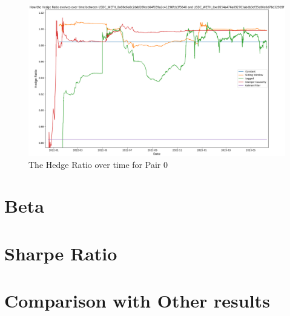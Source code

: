 \begin{figure}[H]
    \centering
    \includegraphics[width=\linewidth]{evaluation/Images/HedgeRatioPerStrat.png}
    \caption{The Hedge Ratio over time for Pair 0}
    \label{fig:HedgeRatioPerStrat}
\end{figure}


\section{Beta}


\section{Sharpe Ratio}

\section{Comparison with Other results}
